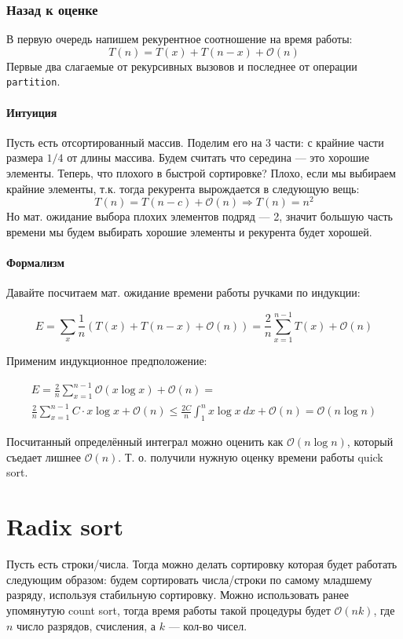 \documentclass[10pt,a4paper]{article}
\renewcommand{\O}{\mathcal{O}}
\begin{document}
\subsubsection{Назад к оценке}

В первую очередь напишем рекурентное соотношение на время работы:
$$T(n) = T(x) + T(n - x) + \O(n)$$ 
Первые два слагаемые от рекурсивных вызовов и последнее от операции \lstinline|partition|.

\paragraph{Интуиция}

Пусть есть отсортированный массив. Поделим его на 3 части: с крайние части 
размера $1/4$ от длины массива. Будем считать что середина --- это хорошие 
элементы. Теперь, что плохого в быстрой сортировке? Плохо, если мы выбираем 
крайние элементы, т.к. тогда рекурента вырождается в следующую вещь: 
$$T(n) = T(n - c) + \O(n) \Rightarrow T(n) = n^2$$
Но мат. ожидание выбора плохих элементов подряд --- 2, значит большую часть 
времени мы будем выбирать хорошие элементы и рекурента будет хорошей.

\paragraph{Формализм}

Давайте посчитаем мат. ожидание времени работы ручками по индукции:

$$
E = 
\sum_x \frac{1}{n}\left(T(x) + T(n - x) + \O(n)\right) =
\frac{2}{n}\sum_{x=1}^{n - 1} T(x) + \O(n)
$$

Применим индукционное предположение:

\begin{gather*}
E = \frac{2}{n} \sum_{x=1}^{n - 1} \O(x\log x) + \O(n) = \\
\frac{2}{n} \sum_{x=1}^{n - 1} C \cdot x\log x + \O(n) \leq
\frac{2C}{n} \int^n_1 x \log x \ dx + \O(n) =
\O(n \log n)
\end{gather*}

Посчитанный определённый интеграл можно оценить как $\O(n \log n)$, который съедает 
лишнее $\O(n)$. Т. о. получили нужную оценку времени работы quick sort.

\section{Radix sort}

Пусть есть строки/числа. Тогда можно делать сортировку которая будет работать
следующим образом: будем сортировать числа/строки по самому младшему разряду,
используя стабильную сортировку. Можно использовать ранее упомянутую count sort,
тогда время работы такой процедуры будет $\O(nk)$, где $n$ число разрядов,
счисления, а $k$ --- кол-во чисел.
\end{document}
